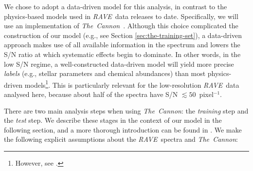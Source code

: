 \documentclass[preprint,trackchanges]{aastex}
\newcommand{\acronym}[1]{{\small{#1}}}
\newcommand{\project}[1]{\textsl{#1}}
\newcommand{\thecannon}{\project{The~Cannon}}
\newcommand{\rave}{\project{\acronym{RAVE}}}
\begin{document}
We chose to adopt a data-driven model for this analysis, in contrast to the
physics-based models used in \rave\ data releases to date.  Specifically, we will
use an implementation of \thecannon\ \citep{Ness_2015,Ness_2016}.  Although this 
choice complicated the construction of our model (e.g., see Section 
\ref{sec:the-training-set}), a data-driven approach makes use of all available 
information in the spectrum and lowers the S/N ratio at which systematic effects 
begin to dominate.  In other words, in the low S/N regime, a well-constructed 
data-driven model will yield more precise \emph{labels} (e.g., stellar parameters 
and chemical abundances) than most physics-driven models\footnote{However, see 
\citet{Casey_2016a}.}.  This is particularly relevant for the low-resolution 
\rave\ data analysed here, because about half of the spectra have S/N 
$\lesssim 50$~pixel$^{-1}$.


There are two main analysis steps when using \thecannon: the \emph{training} 
step and the \emph{test} step.  We describe these stages in the context of our
model in the following section, and a more thorough introduction can be found
in \citet{Ness_2015}.  We make the following explicit assumptions about the 
\rave\ spectra and \thecannon:
\end{document}
